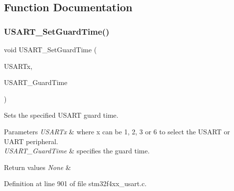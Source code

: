 \subsection{Function Documentation}
\mbox{\label{group___u_s_a_r_t___group6_gac4a35c6acd71ae7e0d67c1f03f0a8777}} 
\subsubsection{\texorpdfstring{U\+S\+A\+R\+T\+\_\+\+Set\+Guard\+Time()}{USART\_SetGuardTime()}}
{\footnotesize\ttfamily void U\+S\+A\+R\+T\+\_\+\+Set\+Guard\+Time (\begin{DoxyParamCaption}\item[{\hyperlink{struct_u_s_a_r_t___type_def}{U\+S\+A\+R\+T\+\_\+\+Type\+Def} $\ast$}]{U\+S\+A\+R\+Tx,  }\item[{uint8\+\_\+t}]{U\+S\+A\+R\+T\+\_\+\+Guard\+Time }\end{DoxyParamCaption})}



Sets the specified U\+S\+A\+RT guard time. 


\begin{DoxyParams}{Parameters}
{\em U\+S\+A\+R\+Tx} & where x can be 1, 2, 3 or 6 to select the U\+S\+A\+RT or U\+A\+RT peripheral. \\
\hline
{\em U\+S\+A\+R\+T\+\_\+\+Guard\+Time} & specifies the guard time. \\
\hline
\end{DoxyParams}

\begin{DoxyRetVals}{Return values}
{\em None} & \\
\hline
\end{DoxyRetVals}


Definition at line 901 of file stm32f4xx\+\_\+usart.\+c.

\mbox{\label{group___u_s_a_r_t___group6_gabd1347e244c623447151ba3a5e986c5f}} 
